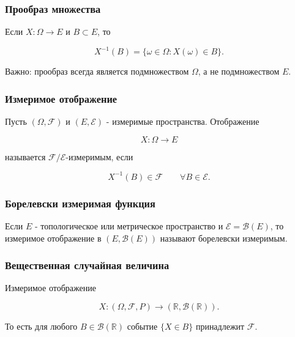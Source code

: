 \documentclass[
  11pt,
  a4paper,
]{article}
\begin{document}
\subsubsection{Прообраз
множества}\label{ux43fux440ux43eux43eux431ux440ux430ux437-ux43cux43dux43eux436ux435ux441ux442ux432ux430}

Если \(X:\Omega\to E\) и \(B\subset E\), то

\[
X^{-1}(B)=\{\omega\in\Omega:X(\omega)\in B\}.
\]

Важно: прообраз всегда является подмножеством \(\Omega\), а не
подмножеством \(E\).

\subsubsection{Измеримое
отображение}\label{ux438ux437ux43cux435ux440ux438ux43cux43eux435-ux43eux442ux43eux431ux440ux430ux436ux435ux43dux438ux435}

Пусть \((\Omega,\mathcal F)\) и \((E,\mathcal E)\) - измеримые
пространства. Отображение

\[
X:\Omega\to E
\]

называется \(\mathcal F/\mathcal E\)-измеримым, если

\[
X^{-1}(B)\in\mathcal F
\qquad \forall B\in\mathcal E.
\]

\subsubsection{Борелевски измеримая
функция}\label{ux431ux43eux440ux435ux43bux435ux432ux441ux43aux438-ux438ux437ux43cux435ux440ux438ux43cux430ux44f-ux444ux443ux43dux43aux446ux438ux44f}

Если \(E\) - топологическое или метрическое пространство и
\(\mathcal E=\mathcal B(E)\), то измеримое отображение в
\((E,\mathcal B(E))\) называют борелевски измеримым.

\subsubsection{Вещественная случайная
величина}\label{ux432ux435ux449ux435ux441ux442ux432ux435ux43dux43dux430ux44f-ux441ux43bux443ux447ux430ux439ux43dux430ux44f-ux432ux435ux43bux438ux447ux438ux43dux430-1}

Измеримое отображение

\[
X:(\Omega,\mathcal F,P)\to(\mathbb R,\mathcal B(\mathbb R)).
\]

То есть для любого \(B\in\mathcal B(\mathbb R)\) событие \(\{X\in B\}\)
принадлежит \(\mathcal F\).
\end{document}
